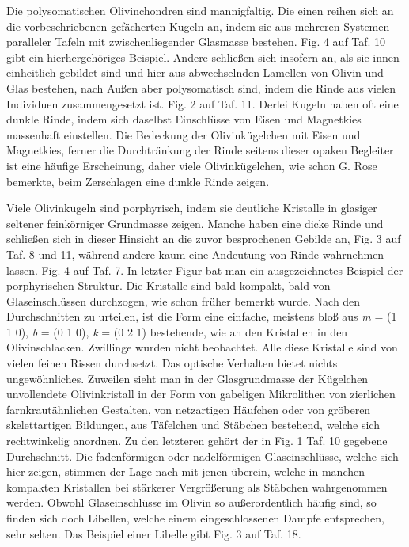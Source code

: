 \documentclass[a4paper, 11pt, oneside, polutonikogreek, german]{article}
\begin{document}
Die polysomatischen Olivinchondren sind mannigfaltig. Die einen reihen sich an die vorbeschriebenen gefächerten Kugeln an, indem sie aus mehreren Systemen paralleler Tafeln mit zwischenliegender Glasmasse bestehen. Fig. 4 auf Taf. 10 gibt ein hierhergehöriges Beispiel. Andere schließen sich insofern an, als sie innen einheitlich gebildet sind und hier aus abwechselnden Lamellen von Olivin und Glas bestehen, nach Außen aber polysomatisch sind, indem die Rinde aus vielen Individuen zusammengesetzt ist. Fig. 2 auf Taf. 11. Derlei Kugeln haben oft eine dunkle Rinde, indem sich daselbst Einschlüsse von Eisen und Magnetkies massenhaft einstellen. Die Bedeckung der Olivinkügelchen mit Eisen und Magnetkies, ferner die Durchtränkung der Rinde seitens dieser opaken Begleiter ist eine häufige Erscheinung, daher viele Olivinkügelchen, wie schon G. Rose bemerkte, beim Zerschlagen eine dunkle Rinde zeigen.

Viele Olivinkugeln sind porphyrisch, indem sie deutliche Kristalle in glasiger seltener feinkörniger Grundmasse zeigen. Manche haben eine dicke Rinde und schließen sich in dieser Hinsicht an die zuvor besprochenen Gebilde an, Fig. 3 auf Taf. 8 und 11, während andere kaum eine Andeutung von Rinde wahrnehmen lassen. Fig. 4 auf Taf. 7. In letzter Figur bat man ein ausgezeichnetes Beispiel der porphyrischen Struktur. Die Kristalle sind bald kompakt, bald von Glaseinschlüssen durchzogen, wie schon früher bemerkt wurde. Nach den Durchschnitten zu urteilen, ist die Form eine einfache, meistens bloß aus \emph{m} = (1 1 0), \emph{b} = (0 1 0), \emph{k} = (0 2 1) bestehende, wie an den Kristallen in den Olivinschlacken. Zwillinge wurden nicht beobachtet. Alle diese Kristalle sind von vielen feinen Rissen durchsetzt. Das optische Verhalten bietet nichts ungewöhnliches. Zuweilen sieht man in der Glasgrundmasse der Kügelchen unvollendete Olivinkristall in der Form von gabeligen Mikrolithen von zierlichen farnkrautähnlichen Gestalten, von netzartigen Häufchen oder von gröberen skelettartigen Bildungen, aus Täfelchen und Stäbchen bestehend, welche sich rechtwinkelig anordnen. Zu den letzteren gehört der in Fig. 1 Taf. 10 gegebene Durchschnitt. Die fadenförmigen oder nadelförmigen Glaseinschlüsse, welche sich hier zeigen, stimmen der Lage nach mit jenen überein, welche in manchen kompakten Kristallen bei stärkerer Vergrößerung als Stäbchen wahrgenommen werden. Obwohl Glaseinschlüsse im Olivin so außerordentlich häufig sind, so finden sich doch Libellen, welche einem eingeschlossenen Dampfe entsprechen, sehr selten. Das Beispiel einer Libelle gibt Fig. 3 auf Taf. 18.
\end{document}
